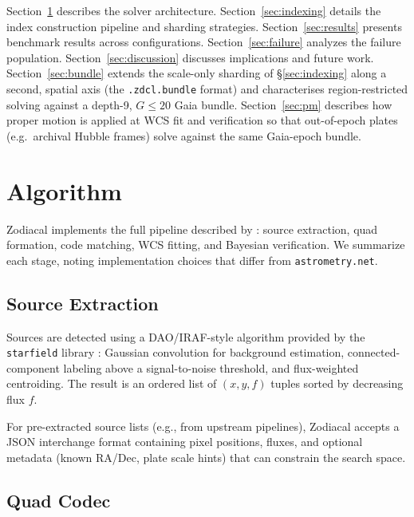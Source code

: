 \documentclass[twocolumn, 10pt]{article}
\begin{document}
Section~\ref{sec:algorithm} describes the solver architecture.
Section~\ref{sec:indexing} details the index construction pipeline and
sharding strategies. Section~\ref{sec:results} presents benchmark results
across configurations. Section~\ref{sec:failure} analyzes the failure
population. Section~\ref{sec:discussion} discusses implications and future
work. Section~\ref{sec:bundle} extends the scale-only sharding of
\S\ref{sec:indexing} along a second, spatial axis (the
\texttt{.zdcl.bundle} format) and characterises region-restricted
solving against a depth-9, $G \le 20$ Gaia bundle.
Section~\ref{sec:pm} describes how proper motion is applied at WCS
fit and verification so that out-of-epoch plates (e.g.\ archival
Hubble frames) solve against the same Gaia-epoch bundle.

\section{Algorithm} \label{sec:algorithm}

Zodiacal implements the full pipeline described by \citet{lang2010}:
source extraction, quad formation, code matching, WCS fitting, and
Bayesian verification. We summarize each stage, noting implementation
choices that differ from \texttt{astrometry.net}.

\subsection{Source Extraction} \label{sec:extraction}

Sources are detected using a DAO/IRAF-style algorithm provided by the
\texttt{starfield} library \citep{starfield}: Gaussian convolution for
background estimation, connected-component labeling above a signal-to-noise
threshold, and flux-weighted centroiding. The result is an ordered list of
$(x, y, f)$ tuples sorted by decreasing flux $f$.

For pre-extracted source lists (e.g., from upstream pipelines), Zodiacal
accepts a JSON interchange format containing pixel positions, fluxes, and
optional metadata (known RA/Dec, plate scale hints) that can constrain the
search space.

\subsection{Quad Codec} \label{sec:codec}
\end{document}

